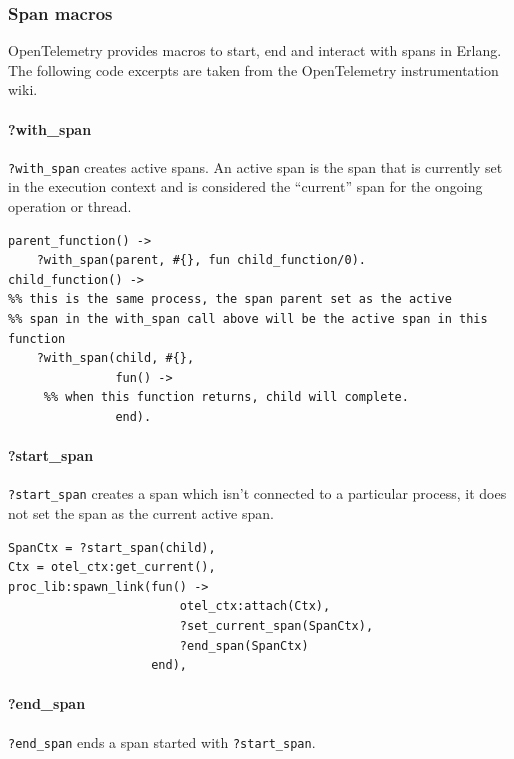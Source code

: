     \subsubsection{Span macros}
        OpenTelemetry provides macros to start, end and interact with spans in Erlang. The following code excerpts are taken from the OpenTelemetry instrumentation wiki. \cite{otel-in}
        \paragraph{?with\_span}
            \texttt{?with\_span} creates active spans. An active span is the span that is currently set in the execution context and is considered the ``current'' span for the ongoing operation or thread. \cite{active-s}
        \begin{verbatim}
parent_function() ->
    ?with_span(parent, #{}, fun child_function/0).
child_function() ->
%% this is the same process, the span parent set as the active
%% span in the with_span call above will be the active span in this function
    ?with_span(child, #{},
               fun() ->
     %% when this function returns, child will complete.
               end).
        \end{verbatim}
        \paragraph{?start\_span}
            \texttt{?start\_span} creates a span which isn't connected to a particular process, it does not set the span as the current active span.
        \begin{verbatim}
SpanCtx = ?start_span(child),
Ctx = otel_ctx:get_current(),
proc_lib:spawn_link(fun() ->
                        otel_ctx:attach(Ctx),
                        ?set_current_span(SpanCtx),
                        ?end_span(SpanCtx)
                    end),
        \end{verbatim}
        \paragraph{?end\_span}
            \texttt{?end\_span} ends a span started with \texttt{?start\_span}.

